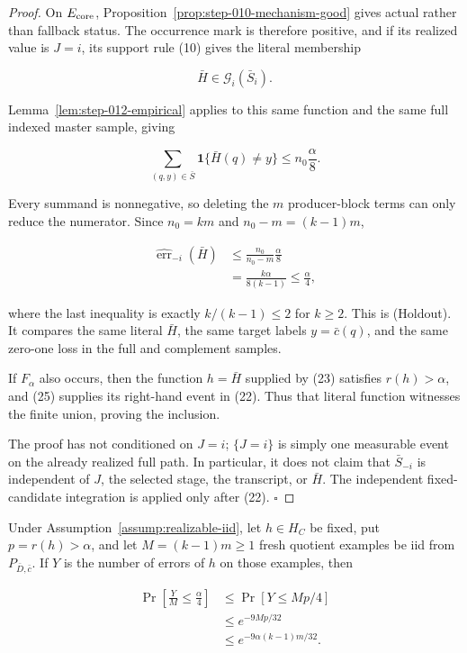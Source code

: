 \begin{proof}
On \(E_{\rm core}\), Proposition~\ref{prop:step-010-mechanism-good} gives actual rather than
fallback status. The occurrence mark is therefore positive, and
if its realized value is \(J=i\), its support rule (10) gives the literal
membership

\[
 \bar H\in\mathcal G_i(\bar S_i).
 \tag{23}
\]

Lemma~\ref{lem:step-012-empirical} applies to this same function
and the same full indexed master sample, giving

\[
 \sum_{(q,y)\in\bar S}
   \mathbf1\{\bar H(q)\ne y\}
 \leq n_0\frac\alpha8.
 \tag{24}
\]

Every summand is nonnegative, so deleting the \(m\) producer-block terms
can only reduce the numerator. Since \(n_0=km\) and
\(n_0-m=(k-1)m\),

\[
\begin{aligned}
 \widehat{\operatorname{err}}_{-i}(\bar H)
 &\leq\frac{n_0}{n_0-m}\frac\alpha8\\
 &=\frac{k\alpha}{8(k-1)}
 \leq\frac\alpha4,
\end{aligned}
 \tag{25}
\]

where the last inequality is exactly \(k/(k-1)\leq2\) for \(k\geq2\).
This is (Holdout). It compares the same literal \(\bar H\), the same target
labels \(y=\bar c(q)\), and the same zero-one loss in the full and
complement samples.

If \(F_\alpha\) also occurs, then the function \(h=\bar H\) supplied by
(23) satisfies \(r(h)>\alpha\), and (25) supplies its right-hand event in
(22). Thus that literal function witnesses the finite union, proving the
inclusion.

The proof has not conditioned on \(J=i\); \(\{J=i\}\) is simply one
measurable event on the already realized full path. In particular, it does
not claim that \(\bar S_{-i}\) is independent of \(J\), the selected stage,
the transcript, or \(\bar H\). The independent fixed-candidate integration
is applied only after (22). \(\square\)


\end{proof}

\begin{lemma}\label{lem:step-013-lower-tail}
Under Assumption~\ref{assump:realizable-iid}, let \(h\in H_C\) be fixed,
put \(p=r(h)>\alpha\), and let \(M=(k-1)m\geq1\) fresh quotient examples
be iid from \(P_{\bar D,\bar c}\). If \(Y\) is the number of errors of
\(h\) on those examples, then

\[
\begin{aligned}
 \Pr\left[\frac YM\leq\frac\alpha4\right]
 &\leq \Pr[Y\leq Mp/4]\\
 &\leq e^{-9Mp/32}\\
 &\leq e^{-9\alpha(k-1)m/32}.
\end{aligned}
 \tag{26}
\]


\end{lemma}

